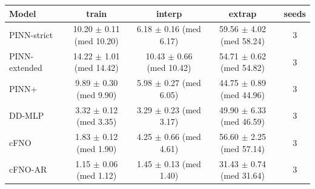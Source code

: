 \begin{tabular}{lcccc}
\toprule
Model & train & interp & extrap & seeds \\
\midrule
PINN-strict & 10.20 $\pm$ 0.11 (med 10.20) & 6.18 $\pm$ 0.16 (med 6.17) & 59.56 $\pm$ 4.02 (med 58.24) & 3 \\
PINN-extended & 14.22 $\pm$ 1.01 (med 14.42) & 10.43 $\pm$ 0.66 (med 10.42) & 54.71 $\pm$ 0.62 (med 54.82) & 3 \\
PINN+ & 9.89 $\pm$ 0.30 (med 9.90) & 5.98 $\pm$ 0.27 (med 6.05) & 44.75 $\pm$ 0.89 (med 44.96) & 3 \\
DD-MLP & 3.32 $\pm$ 0.12 (med 3.35) & 3.29 $\pm$ 0.23 (med 3.17) & 49.90 $\pm$ 6.33 (med 46.59) & 3 \\
cFNO & 1.83 $\pm$ 0.12 (med 1.90) & 4.25 $\pm$ 0.66 (med 4.61) & 56.60 $\pm$ 2.25 (med 57.14) & 3 \\
cFNO-AR & 1.15 $\pm$ 0.06 (med 1.12) & 1.45 $\pm$ 0.13 (med 1.40) & 31.43 $\pm$ 0.74 (med 31.64) & 3 \\
\bottomrule
\end{tabular}
